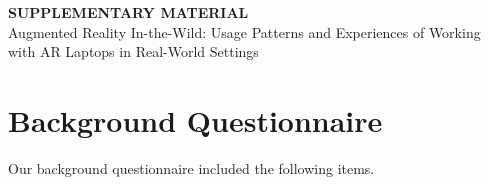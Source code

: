 \clearpage

\setcounter{page}{1}

\renewcommand{\thefigure}{A\arabic{figure}}
\setcounter{figure}{0}     

\renewcommand{\thetable}{A\arabic{table}}
\setcounter{table}{0}   

\renewcommand{\thesection}{A\arabic{section}}
\setcounter{section}{0}   

\begin{center} 
\textbf{SUPPLEMENTARY MATERIAL} 
\\[1em]
\centering
Augmented Reality In-the-Wild: Usage Patterns and Experiences of Working with AR Laptops in Real-World Settings
\end{center}

\section{Background Questionnaire}
Our background questionnaire included the following items. 
